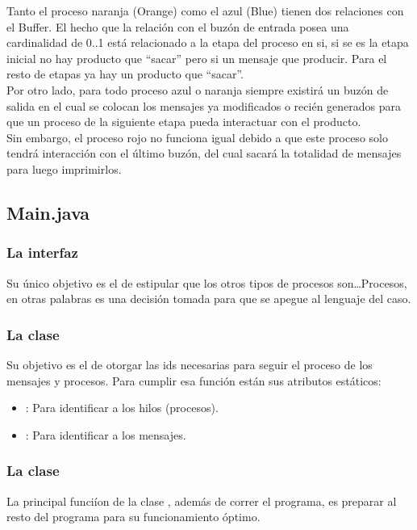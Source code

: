 \documentclass[a4paper]{article}
\begin{document}
    Tanto el proceso naranja (Orange) como el azul (Blue) tienen dos relaciones con el Buffer.
    El hecho que la relaci\'on con el buz\'on de entrada posea una cardinalidad de 0..1 est\'a relacionado a la etapa del proceso en si, si se es la etapa inicial no hay producto que ``sacar'' pero si un mensaje que producir.
    Para el resto de etapas ya hay un producto que ``sacar''.\\
    Por otro lado, para todo proceso azul o naranja siempre existir\'a un buz\'on de salida en el cual se colocan los mensajes ya modificados o reci\'en generados para que un proceso de la siguiente etapa pueda interactuar con el producto.\\
    Sin embargo, el proceso rojo no funciona igual debido a que este proceso solo tendr\'a interacci\'on con el \'ultimo buz\'on, del cual sacar\'a la totalidad de mensajes para luego imprimirlos.

    \subsection{Main.java}

    \subsubsection{La interfaz }
    Su \'unico objetivo es el de estipular que los otros tipos de procesos son\ldots Procesos, en otras palabras es una decisi\'on tomada para que se apegue al lenguaje del caso.

    \subsubsection{La clase }
    Su objetivo es el de otorgar las ids necesarias para seguir el proceso de los mensajes y procesos.
    Para cumplir esa funci\'on est\'an sus atributos est\'aticos:
    \begin{itemize}
        \item {}: Para identificar a los hilos (procesos).
        \item {}: Para identificar a los mensajes.
    \end{itemize}

    \subsubsection{La clase }
    La principal funci\'ion de la clase , adem\'as de correr el programa,
    es preparar al resto del programa para su funcionamiento \'optimo.\\
\end{document}
